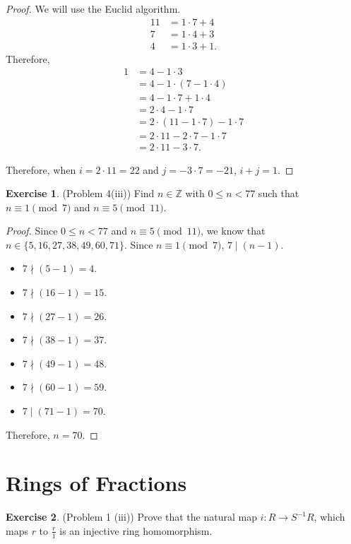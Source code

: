 \documentclass[12pt, psamsfonts]{amsart}
\theoremstyle{definition}
\newtheorem*{exer}{Exercise}
\theoremstyle{remark}
\numberwithin{equation}{section}
\begin{document}
\begin{proof}
  We will use the Euclid algorithm.
  \begin{align*}
    11 &= 1 \cdot 7 + 4 \\
    7 &= 1 \cdot 4 + 3 \\
    4 &= 1 \cdot 3 + 1.
  \end{align*}
  Therefore,
  \begin{align*}
    1 &= 4 - 1 \cdot 3 \\
      &= 4 - 1 \cdot (7 - 1 \cdot 4) \\
      &= 4 - 1 \cdot 7 + 1 \cdot 4 \\
      &= 2 \cdot 4 - 1 \cdot 7 \\
      &= 2 \cdot (11 - 1 \cdot 7) - 1 \cdot 7 \\
      &= 2 \cdot 11 - 2 \cdot 7 - 1 \cdot 7 \\
      &= 2 \cdot 11 - 3 \cdot 7.
  \end{align*}

  Therefore, when $i = 2 \cdot 11 = 22$ and $j = -3 \cdot 7 = -21$, $i + j = 1$.
\end{proof}

\begin{exer}{(Problem 4(iii))}
  Find $n \in \mathbb{Z}$ with $0 \leq n < 77$ such that $n \equiv 1 \pmod 7$ and $n \equiv 5 \pmod{11}$.
\end{exer}

\begin{proof}
  Since $0 \leq n < 77$ and $n \equiv 5 \pmod{11}$, we know that $n \in \{ 5, 16, 27, 38, 49, 60, 71 \}$.
  Since $n \equiv 1 \pmod 7$, $7 \mid (n - 1)$.
  \begin{itemize}
    \item $7 \nmid (5 - 1) = 4$.
    \item $7 \nmid (16 - 1) = 15$.
    \item $7 \nmid (27 - 1) = 26$.
    \item $7 \nmid (38 - 1) = 37$.
    \item $7 \nmid (49 - 1) = 48$.
    \item $7 \nmid (60 - 1) = 59$.
    \item $7 \mid (71 - 1) = 70$.
  \end{itemize}
  Therefore, $n = 70$.
\end{proof}


\section{Rings of Fractions}
\begin{exer}{(Problem 1 (iii))}
  Prove that the natural map $i: R \rightarrow S^{-1}R$, which maps $r$ to $\frac{r}{1}$ is an injective ring homomorphism.
\end{exer}
\end{document}
